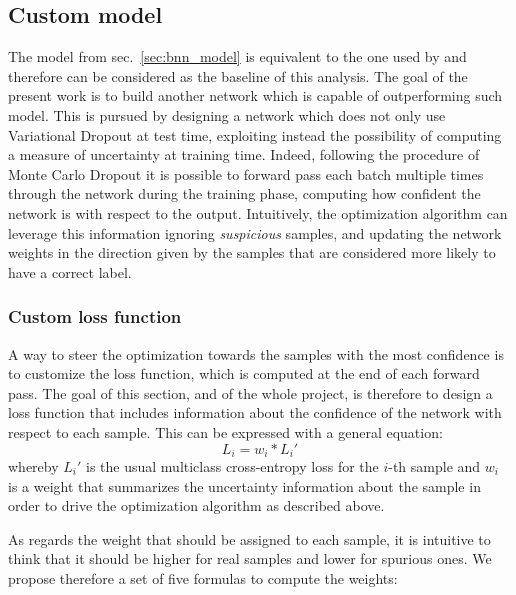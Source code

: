 \documentclass[11pt,twoside,a4paper]{article}
\begin{document}
\subsection{Custom model}
\label{sec:custom_model}
The model from sec.~\ref{sec:bnn_model} is equivalent to the one used by \cite{kwon2018uncertainty} and therefore can be considered as the baseline of this analysis. The goal of the present work is to build another network which is capable of outperforming such model.\newline
This is pursued by designing a network which does not only use Variational Dropout at test time, exploiting instead the possibility of computing a measure of uncertainty at training time. Indeed, following the procedure of Monte Carlo Dropout it is possible to forward pass each batch multiple times through the network during the training phase, computing how confident the network is with respect to the output.\newline
Intuitively, the optimization algorithm can leverage this information ignoring \textit{suspicious} samples, and updating the network weights in the direction given by the samples that are considered more likely to have a correct label.\newline

\subsubsection{Custom loss function}
A way to steer the optimization towards the samples with the most confidence is to customize the loss function, which is computed at the end of each forward pass. The goal of this section, and of the whole project, is therefore to design a loss function that includes information about the confidence of the network with respect to each sample. This can be expressed with a general equation:
\begin{equation}
\label{eq1}
L_{i} = w_{i} * {L_{i}}'
\end{equation}
whereby \({L_{i}}'\) is the usual multiclass cross-entropy loss for the \(i\)-th sample and \(w_{i}\) is a weight that summarizes the uncertainty information about the sample in order to drive the optimization algorithm as described above.

As regards the weight that should be assigned to each sample, it is intuitive to think that it should be higher for real samples and lower for spurious ones. We propose therefore a set of five formulas to compute the weights:
\end{document}
